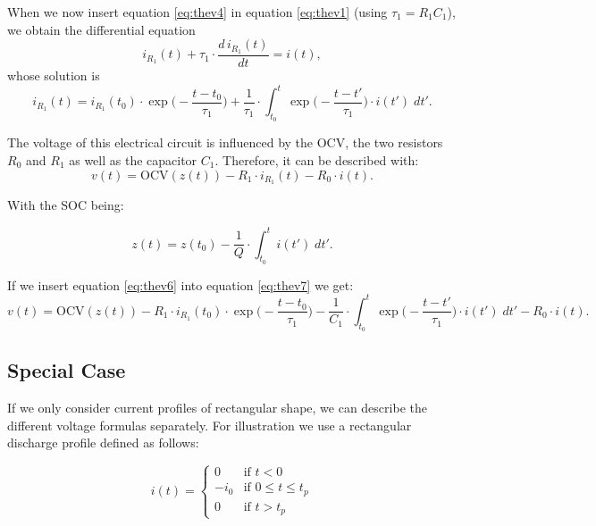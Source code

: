 When we now insert equation \ref{eq:thev4} in equation \ref{eq:thev1} (using $\tau_1 = R_1 C_1$), we obtain the differential equation
\begin{equation} \label{eq:thev5}
i_{R_1}(t) + \tau_1 \cdot \frac{d \, i_{R_1}(t)}{d t} = i(t),
\end{equation}
whose solution is
\begin{equation} \label{eq:thev6}
i_{R_1}(t) = i_{R_1}(t_0) \cdot \exp{\bigg(-\frac{t-t_0}{\tau_1}\bigg)} + \frac{1}{\tau_1} \cdot \int_{t_0}^{t} \exp{\bigg(-\frac{t-t'}{\tau_1}\bigg)} \cdot i(t') \; d t'.
\end{equation}

The voltage of this electrical circuit is influenced by the OCV, the two resistors $R_0$ and $R_1$ as well as the capacitor $C_1$. Therefore, it can be described with:
\begin{equation} \label{eq:thev7}
v(t) = \text{OCV}(z(t)) - R_1 \cdot i_{R_1}(t) - R_0 \cdot i(t).
\end{equation}

With the SOC being:

\begin{equation} \label{eq:thev8}
z(t) = z(t_0) - \frac{1}{Q} \cdot \int_{t_0}^{t} i(t') \; d t'.
\end{equation}

If we insert equation \ref{eq:thev6} into equation \ref{eq:thev7} we get:
\begin{equation} \label{eq:thev9}
v(t) = \text{OCV}(z(t)) - R_1 \cdot i_{R_1}(t_0) \cdot \exp{\bigg(-\frac{t-t_0}{\tau_1}\bigg)} - \frac{1}{C_1} \cdot \int_{t_0}^{t} \exp{\bigg(-\frac{t-t'}{\tau_1}\bigg)} \cdot i(t') \; d t' - R_0 \cdot i(t).
\end{equation}

\subsection{Special Case}
If we only consider current profiles of rectangular shape, we can describe the different voltage formulas separately. For illustration we use a rectangular discharge profile defined as follows:

\begin{equation} \label{eq:thev10}
i(t) =
\left\{
	\begin{array}{ll}
		0  & \mbox{if } t < 0 \\
		-i_0 & \mbox{if } 0 \leq t \leq t_p \\
		0 & \mbox{if } t > t_p
	\end{array}
\right.
\end{equation}

